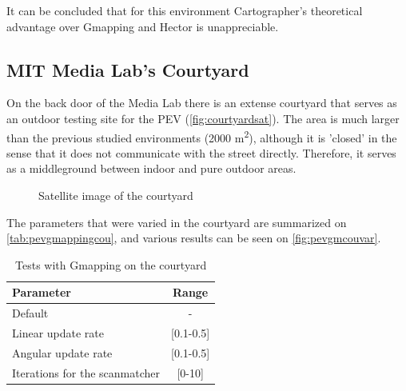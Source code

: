 It can be concluded that for this environment Cartographer's theoretical advantage over Gmapping and Hector is unappreciable.

\subsection{MIT Media Lab's Courtyard}
On the back door of the Media Lab there is an extense courtyard that serves as an outdoor testing site for the PEV (\autoref{fig:courtyardsat}). The area is much larger than the previous studied environments (2000 m\textsuperscript{2}), although it is 'closed' in the sense that it does not communicate with the street directly. Therefore, it serves as a middleground between indoor and pure outdoor areas.
\begin{figure}[h!]
  \centering
  \caption{Satellite image of the courtyard}
  \label{fig:courtyardsat}
\end{figure}

 The parameters that were varied in the courtyard are summarized on \autoref{tab:pevgmappingcou}, and various results can be seen on \autoref{fig:pevgmcouvar}.
\begin{table}[h]
  \centering
  \begin{tabular}{lc}
    \hline
    \textbf{Parameter} & \textbf{Range} \\ \hline
    Default & - \\ \hline
    Linear update rate & {[}0.1-0.5{]} \\ \hline
    Angular update rate & {[}0.1-0.5{]} \\ \hline
    Iterations for the scanmatcher & {[}0-10{]} \\ \hline
  \end{tabular}
  \caption{Tests with Gmapping on the courtyard}
  \label{tab:pevgmappingcou}
\end{table}

